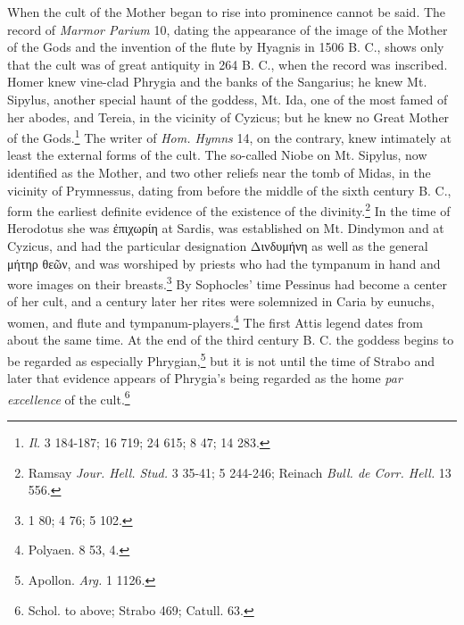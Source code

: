 \documentclass[a4paper, 11pt, oneside, polutonikogreek, english]{article}
\begin{document}
When the cult of the Mother began to rise into prominence cannot be said. The record of \emph{Marmor Parium} 10, dating the appearance of the image of the Mother of the Gods and the invention of the flute by Hyagnis in 1506 B. C., shows only that the cult was of great antiquity in 264 B. C., when the record was inscribed. Homer knew vine-clad Phrygia and the banks of the Sangarius; he knew Mt. Sipylus, another special haunt of the goddess, Mt. Ida, one of the most famed of her abodes, and Tereia, in the vicinity of Cyzicus; but he knew no Great Mother of the Gods.\footnote{\emph{Il.} 3 184-187; 16 719; 24 615; 8 47; 14 283.} The writer of \emph{Hom. Hymns} 14, on the contrary, knew intimately at least the external forms of the cult. The so-called Niobe on Mt. Sipylus, now identified as the Mother, and two other reliefs near the tomb of Midas, in the vicinity of Prymnessus, dating from before the middle of the sixth century B. C., form the earliest definite evidence of the existence of the divinity.\footnote{Ramsay \emph{Jour. Hell. Stud.} 3 35-41; 5 244-246; Reinach \emph{Bull. de Corr. Hell.} 13 556.} In the time of Herodotus she was ἐπιχωρίη at Sardis, was established on Mt. Dindymon and at Cyzicus, and had the particular designation Δινδυμήνη as well as the general μήτηρ θεῶν, and was worshiped by priests who had the tympanum in hand and wore images on their breasts.\footnote{1 80; 4 76; 5 102.} By Sophocles' time Pessinus had become a center of her cult, and a century later her rites were solemnized in Caria by eunuchs, women, and flute and tympanum-players.\footnote{Polyaen. 8 53, 4.} The first Attis legend dates from about the same time. At the end of the third century B. C. the goddess begins to be regarded as especially Phrygian,\footnote{Apollon. \emph{Arg.} 1 1126.} but it is not until the time of Strabo and later that evidence appears of Phrygia's being regarded as the home \emph{par excellence} of the cult.\footnote{Schol. to above; Strabo 469; Catull. 63.}
\end{document}
